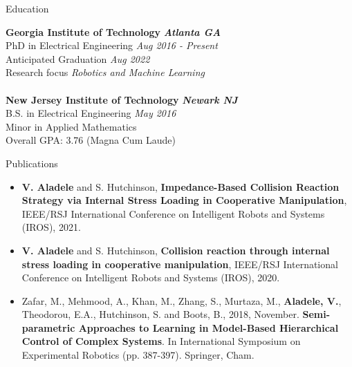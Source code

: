 \documentclass{resume} %
\begin{document}

\begin{rSection}{Education}

{\bf Georgia Institute of Technology} \hfill {\bf \em Atlanta GA} \\ 
PhD in Electrical Engineering \hfill {\em Aug 2016 - Present}\\
Anticipated Graduation \hfill {\em Aug 2022}\\
Research focus \hfill {\em Robotics and Machine Learning}\\
\\
{\bf New Jersey Institute of Technology} \hfill {\bf \em Newark NJ} \\ 
B.S. in Electrical Engineering \hfill {\em May 2016}\\
Minor in Applied Mathematics \\
Overall GPA: 3.76 (Magna Cum Laude)

\end{rSection}

\begin{rSection}{Publications}
\begin{itemize}
\item \textbf{V. Aladele} and S. Hutchinson, \textbf{Impedance-Based Collision Reaction Strategy via Internal Stress Loading in Cooperative Manipulation}, IEEE/RSJ International Conference on Intelligent Robots and Systems (IROS), 2021.

\item \textbf{V. Aladele} and S. Hutchinson, \textbf{Collision reaction through internal stress loading in cooperative manipulation}, IEEE/RSJ International Conference on Intelligent Robots and Systems (IROS), 2020.

\item Zafar, M., Mehmood, A., Khan, M., Zhang, S., Murtaza, M., \textbf{Aladele, V.}, Theodorou, E.A., Hutchinson, S. and Boots, B., 2018, November. \textbf{Semi-parametric Approaches to Learning in Model-Based Hierarchical Control of Complex Systems}. In International Symposium on Experimental Robotics (pp. 387-397). Springer, Cham.
\end{itemize}
\end{rSection}
\end{document}
